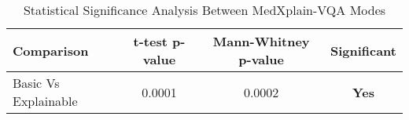 
\begin{table}[htbp]
\centering
\caption{Statistical Significance Analysis Between MedXplain-VQA Modes}
\label{tab:statistical_analysis}
\begin{tabular}{lccc}
\toprule
\textbf{Comparison} & \textbf{t-test p-value} & \textbf{Mann-Whitney p-value} & \textbf{Significant} \\
\midrule
Basic Vs Explainable & 0.0001 & 0.0002 & \textbf{Yes} \\
\bottomrule
\end{tabular}
\end{table}
